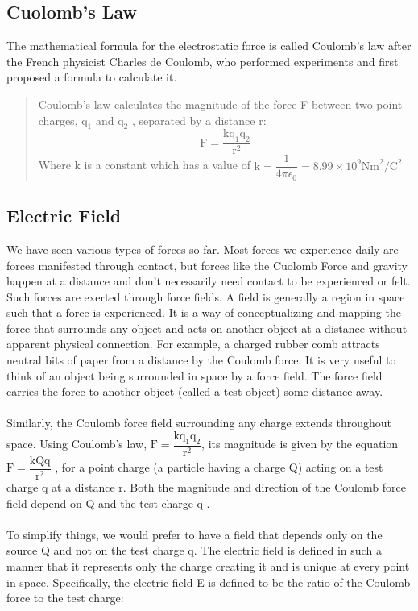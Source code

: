 \documentclass[9pt]{exam}
\begin{document}
	\subsection*{Cuolomb's Law}
	The mathematical formula for the electrostatic force is called Coulomb’s law after the French physicist Charles de Coulomb, who performed experiments and first proposed a formula to calculate it.
	\begin{quotation}
		Coulomb’s law calculates the magnitude of the force  F  between two point charges,  $\text{q}_1\text{  and  q}_2$ , separated by a distance r:
		$$\text{F}=\dfrac{\text{kq}_1\text{q}_2}{\text{r}^2}$$
		Where k is a constant which has a value of $\text{k}=\dfrac{1}{4\pi\epsilon_0}=8.99\times10^{9}\text{Nm}^2/\text{C}^2$
	\end{quotation}
	\subsection*{Electric Field}
	We have seen various types of forces so far. Most forces we experience daily are forces manifested through contact, but forces like the Cuolomb Force and gravity happen at a distance and don't necessarily need contact to be experienced or felt. Such forces are exerted through force fields. A field is generally a region in space such that a force is experienced. It is a way of conceptualizing and mapping the force that surrounds any object and acts on another object at a distance without apparent physical connection. For example, a charged rubber comb attracts neutral bits of paper from a distance by the Coulomb force. It is very useful to think of an object being surrounded in space by a force field. The force field carries the force to another object (called a test object) some distance away.  \\ \\
	Similarly, the Coulomb force field surrounding any charge extends throughout space. Using Coulomb’s law,  $\text{F}=\dfrac{\text{kq}_1\text{q}_2}{\text{r}^2}$, its magnitude is given by the equation  $\text{F}=\dfrac{\text{kQq}}{\text{r}^2}$ , for a point charge (a particle having a charge Q) acting on a test charge  q at a distance r. Both the magnitude and direction of the Coulomb force field depend on  Q  and the test charge  q . \\ \\
	To simplify things, we would prefer to have a field that depends only on the source Q and not on the test charge q. The electric field is defined in such a manner that it represents only the charge creating it and is unique at every point in space. Specifically, the electric field E is defined to be the ratio of the Coulomb force to the test charge:
\end{document}
